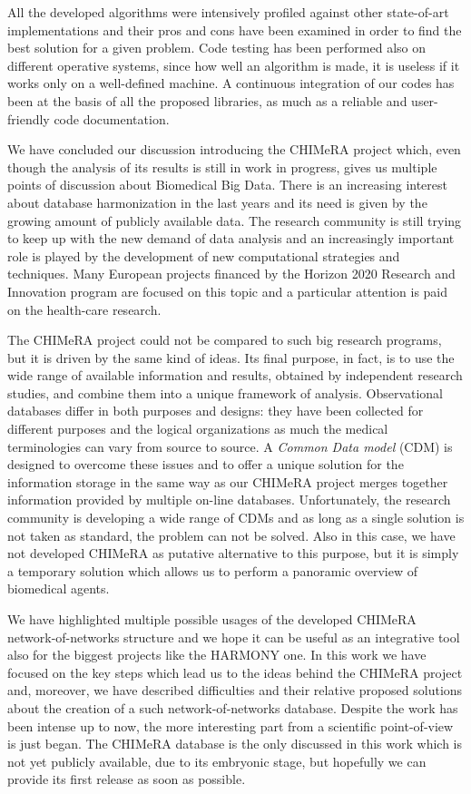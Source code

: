\documentclass{standalone}
\begin{document}
All the developed algorithms were intensively profiled against other state-of-art implementations and their pros and cons have been examined in order to find the best solution for a given problem.
Code testing has been performed also on different operative systems, since how well an algorithm is made, it is useless if it works only on a well-defined machine.
A continuous integration of our codes has been at the basis of all the proposed libraries, as much as a reliable and user-friendly code documentation.

We have concluded our discussion introducing the \textsf{CHIMeRA} project which, even though the analysis of its results is still in work in progress, gives us multiple points of discussion about Biomedical Big Data.
There is an increasing interest about database harmonization in the last years and its need is given by the growing amount of publicly available data.
The research community is still trying to keep up with the new demand of data analysis and an increasingly important role is played by the development of new computational strategies and techniques.
Many European projects financed by the Horizon 2020 Research and Innovation program are focused on this topic and a particular attention is paid on the health-care research.

The \textsf{CHIMeRA} project could not be compared to such big research programs, but it is driven by the same kind of ideas.
Its final purpose, in fact, is to use the wide range of available information and results, obtained by independent research studies, and combine them into a unique framework of analysis.
Observational databases differ in both purposes and designs: they have been collected for different purposes and the logical organizations as much the medical terminologies can vary from source to source.
A \emph{Common Data model} (CDM) is designed to overcome these issues and to offer a unique solution for the information storage in the same way as our \textsf{CHIMeRA} project merges together information provided by multiple on-line databases.
Unfortunately, the research community is developing a wide range of CDMs and as long as a single solution is not taken as standard, the problem can not be solved.
Also in this case, we have not developed \textsf{CHIMeRA} as putative alternative to this purpose, but it is simply a temporary solution which allows us to perform a panoramic overview of biomedical agents.

We have highlighted multiple possible usages of the developed \textsf{CHIMeRA} network-of-networks structure and we hope it can be useful as an integrative tool also for the biggest projects like the HARMONY one.
In this work we have focused on the key steps which lead us to the ideas behind the \textsf{CHIMeRA} project and, moreover, we have described difficulties and their relative proposed solutions about the creation of a such network-of-networks database.
Despite the work has been intense up to now, the more interesting part from a scientific point-of-view is just began.
The \textsf{CHIMeRA} database is the only  discussed in this work which is not yet publicly available, due to its embryonic stage, but hopefully we can provide its first release as soon as possible.
\end{document}
